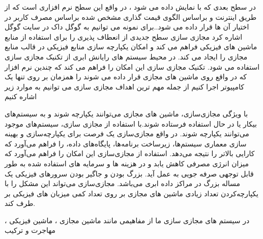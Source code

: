  در سطح بعدی که با 
 نمایش داده می شود ، در واقع این سطح نرم افزاری است که از طریق اینترنت و براساس الگوی قیمت گذاری مشخص شده براساس مصرف کاربر در اختیار آن ها قرار داده می شود..برای نمونه می توانیم به گوگل داک در سایت گوگل اشاره کرد
  \cite{num3,num4}
مجازی سازی سطح جدیدی از انعطاف پذیری را برای استفاده از منابع ماشین های فیزیکی
 فراهم می کند و امکان یکپارچه سازی منابع فیزیکی   در قالب منابع مجازی  را ایجاد می کند. در محیط سیستم های رایانش ابری از تکنیک مجازی سازی استفاده می شود. تکنیک مجازی سازی این امکان را فراهم می کند که چندین نرم افزار که در واقع روی ماشین های مجازی
 قرار داده می شوند را همزمان بر روی تنها یک کامپیوتر اجرا کنیم از جمله مهم ترین اهداف مجازی سازی می توانیم به موارد زیر اشاره کنیم

با ویژگی مجازی‌سازی، ماشین های مجازی می‌توانند یکپارچه شوند و به سیستم‌های بیکار یا در حال استفاده فرستاده شوند.با استفاده از مجازی سازی، سیستم‌های موجود می‌توانند یکپارچه شوند. در واقع مجازی‌سازی یک فرصت برای یکپارچه‌سازی و بهینه سازی معماری سیستم‌ها، زیرساخت برنامه‌ها، پایگاه‌های داده، را فراهم می‌آورد که کارایی بالاتر را نتیجه می‌دهد.
 استفاده از مجازی‌سازی این امکان را فراهم می‌آورد که میزان انرژی مصرفی کاهش یابد و در هزینه ها و سرمایه های استفاده شده به طور قابل توجهی صرفه جویی به عمل آید.
  بزرگ بودن و جاگیر بودن سرورهای فیزیکی یک مساله بزرگ در مراکز داده ابری می‌باشد. مجازی‌سازی می‌تواند این مشکل را با یکپارچه‌کردن تعداد زیادی ماشین های مجازی بر روی تعداد کمی میزبان های فیزیکی بر طرف کند.
  
  در سیستم های مجازی سازی ما از مفاهیمی مانند ماشین مجازی ، ماشین فیزیکی ، مهاجرت و ترکیب
  
